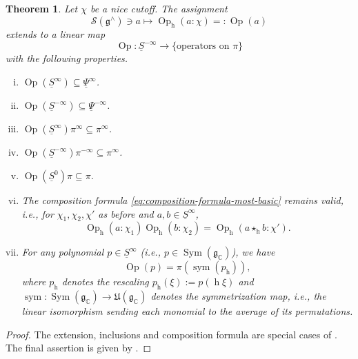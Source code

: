 \documentclass[reqno]{amsart}
\DeclareMathOperator{\h}{h}
\DeclareMathOperator{\Sym}{Sym}
\DeclareMathOperator{\Opp}{Op}
\DeclareMathOperator{\sym}{sym}
\theoremstyle{plain} \newtheorem{theorem} {Theorem}
\theoremstyle{definition} \newtheorem{definition} [theorem] {Definition}
\theoremstyle{itplain} %
\numberwithin{equation}{section}
\numberwithin{theorem}{section}
\begin{document}
\begin{theorem}\label{thm:qualitative-extended-operator-assignment}
  Let $\chi$ be a nice cutoff.  The assignment
  \begin{equation*}
    \mathcal{S}(\mathfrak{g}^\wedge) \ni a \mapsto \Opp_{\h}(a:\chi) =: \Opp(a)
  \end{equation*}
extends to a linear map
  \begin{equation*}
    \Opp : \underline{S}^{-\infty} \rightarrow
    \{\text{operators on } \pi\}
  \end{equation*}
  with the following properties.
  \begin{enumerate}[(i)]
  \item $\Opp(\underline{S}^\infty) \subseteq \underline{\Psi}^{\infty}$.
  \item $\Opp(\underline{S}^{-\infty}) \subseteq \underline{\Psi}^{-\infty}$.
  \item $\Opp(\underline{S}^{\infty}) \pi^\infty \subseteq \pi^\infty$.
  \item $\Opp(\underline{S}^{-\infty}) \pi^{-\infty} \subseteq \pi^\infty$.
  \item $\Opp (\underline{S}^0) \pi \subseteq \pi$.
  \item The composition formula \eqref{eq:composition-formula-most-basic} remains valid, i.e., for $\chi_1, \chi_2, \chi '$ as before and $a, b \in \underline{S}^{\infty}$,
    \begin{equation}\label{eq:qualitative-composition-formula}
      \Opp_{\h}(a:\chi_1)
      \Opp_{\h}(b:\chi_2)
      =
      \Opp_{\h}(a \star_{\h} b:\chi').
    \end{equation}
  \item For any polynomial $p \in \underline{S}^\infty$ (i.e., $p \in \Sym(\mathfrak{g}_{\mathbb{C}})$), we have
    \begin{equation}\label{eq:oppp-=-pisymp_h}
      \Opp(p) = \pi(\sym(p_{\h})),
    \end{equation}
    where $p_{\h}$ denotes the rescaling $p_{\h}(\xi) := p(\h \xi)$ and $\sym : \Sym(\mathfrak{g}_\mathbb{C}) \rightarrow \mathfrak{U}(\mathfrak{g}_\mathbb{C})$ denotes the symmetrization map, i.e., the linear isomorphism sending each monomial to the average of its permutations.
  \end{enumerate}
\end{theorem}
\begin{proof}
  The extension, inclusions and composition formula are special cases of \cite[Thm 10.6]{2020arXiv201202187N}.  The final assertion is given by \cite[\S5.2, \S8.1]{nelson-venkatesh-1}.
\end{proof}
\end{document}
